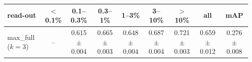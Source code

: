 \begin{tabular}{lcccccccc}
\toprule
read-out & $<$0.1\% & 0.1--0.3\% & 0.3--1\% & 1--3\% & 3--10\% & $>$10\% & all & mAP \\
\midrule
max\_full ($k=3$) & -- & 0.615 $\pm$ 0.004 & 0.665 $\pm$ 0.003 & 0.648 $\pm$ 0.004 & 0.687 $\pm$ 0.004 & 0.721 $\pm$ 0.003 & 0.659 $\pm$ 0.012 & 0.276 $\pm$ 0.008 \\
\bottomrule
\end{tabular}
